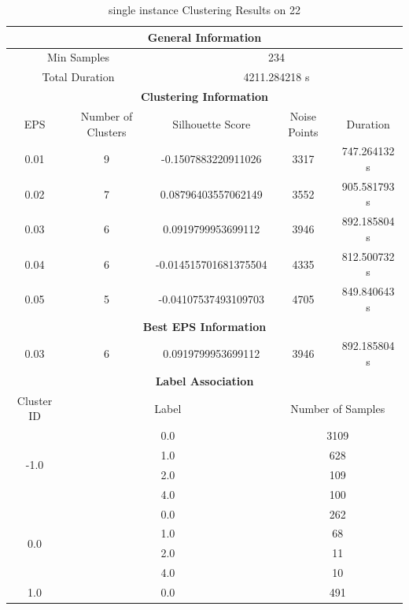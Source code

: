 \begin{longtable}{|c|c|c|c|c|}
\caption{single instance Clustering Results on 22} \label{tab:22_single_instance_clustering_results}\\
\hline
\multicolumn{5}{|c|}{\textbf{General Information}} \\
\hline
\multicolumn{2}{|c|}{Min Samples} & \multicolumn{3}{c|}{234} \\
\multicolumn{2}{|c|}{Total Duration} & \multicolumn{3}{c|}{4211.284218 s} \\
\hline
\multicolumn{5}{|c|}{\textbf{Clustering Information}} \\
\hline
EPS & Number of Clusters & Silhouette Score & Noise Points & Duration \\
0.01 & 9 & -0.1507883220911026 & 3317 & 747.264132 s\\
0.02 & 7 & 0.08796403557062149 & 3552 & 905.581793 s\\
0.03 & 6 & 0.0919799953699112 & 3946 & 892.185804 s\\
0.04 & 6 & -0.014515701681375504 & 4335 & 812.500732 s\\
0.05 & 5 & -0.04107537493109703 & 4705 & 849.840643 s\\
\hline
\multicolumn{5}{|c|}{\textbf{Best EPS Information}} \\
\hline
0.03 & 6 & 0.0919799953699112 & 3946 & 892.185804 s\\
\hline
\multicolumn{5}{|c|}{\textbf{Label Association}} \\
\hline
Cluster ID & \multicolumn{2}{c|}{Label} & \multicolumn{2}{c|}{Number of Samples} \\
\hline
\multirow{4}{*}{-1.0} & \multicolumn{2}{c|}{0.0} & \multicolumn{2}{c|}{3109} \\
& \multicolumn{2}{c|}{1.0} & \multicolumn{2}{c|}{628} \\
& \multicolumn{2}{c|}{2.0} & \multicolumn{2}{c|}{109} \\
& \multicolumn{2}{c|}{4.0} & \multicolumn{2}{c|}{100} \\
\hline
\multirow{4}{*}{0.0} & \multicolumn{2}{c|}{0.0} & \multicolumn{2}{c|}{262} \\
& \multicolumn{2}{c|}{1.0} & \multicolumn{2}{c|}{68} \\
& \multicolumn{2}{c|}{2.0} & \multicolumn{2}{c|}{11} \\
& \multicolumn{2}{c|}{4.0} & \multicolumn{2}{c|}{10} \\
\hline
\multirow{4}{*}{1.0} & \multicolumn{2}{c|}{0.0} & \multicolumn{2}{c|}{491} \\

\end{longtable}
